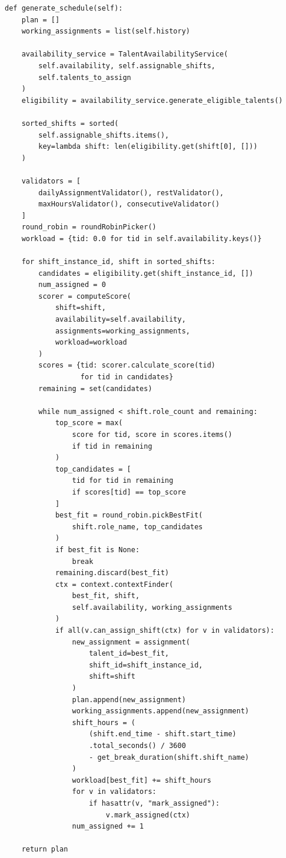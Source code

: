 \begin{lstlisting}[caption={ScheduleBuilder.generate\_schedule() — full implementation}, label={lst:full_engine}]
def generate_schedule(self):
    plan = []
    working_assignments = list(self.history)

    availability_service = TalentAvailabilityService(
        self.availability, self.assignable_shifts,
        self.talents_to_assign
    )
    eligibility = availability_service.generate_eligible_talents()

    sorted_shifts = sorted(
        self.assignable_shifts.items(),
        key=lambda shift: len(eligibility.get(shift[0], []))
    )

    validators = [
        dailyAssignmentValidator(), restValidator(),
        maxHoursValidator(), consecutiveValidator()
    ]
    round_robin = roundRobinPicker()
    workload = {tid: 0.0 for tid in self.availability.keys()}

    for shift_instance_id, shift in sorted_shifts:
        candidates = eligibility.get(shift_instance_id, [])
        num_assigned = 0
        scorer = computeScore(
            shift=shift,
            availability=self.availability,
            assignments=working_assignments,
            workload=workload
        )
        scores = {tid: scorer.calculate_score(tid)
                  for tid in candidates}
        remaining = set(candidates)

        while num_assigned < shift.role_count and remaining:
            top_score = max(
                score for tid, score in scores.items()
                if tid in remaining
            )
            top_candidates = [
                tid for tid in remaining
                if scores[tid] == top_score
            ]
            best_fit = round_robin.pickBestFit(
                shift.role_name, top_candidates
            )
            if best_fit is None:
                break
            remaining.discard(best_fit)
            ctx = context.contextFinder(
                best_fit, shift,
                self.availability, working_assignments
            )
            if all(v.can_assign_shift(ctx) for v in validators):
                new_assignment = assignment(
                    talent_id=best_fit,
                    shift_id=shift_instance_id,
                    shift=shift
                )
                plan.append(new_assignment)
                working_assignments.append(new_assignment)
                shift_hours = (
                    (shift.end_time - shift.start_time)
                    .total_seconds() / 3600
                    - get_break_duration(shift.shift_name)
                )
                workload[best_fit] += shift_hours
                for v in validators:
                    if hasattr(v, "mark_assigned"):
                        v.mark_assigned(ctx)
                num_assigned += 1

    return plan
\end{lstlisting}

